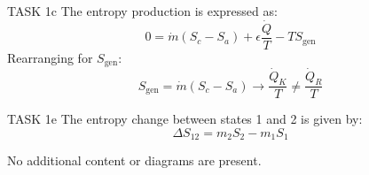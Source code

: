 TASK 1c  
The entropy production is expressed as:  
\[
0 = \dot{m}(S_c - S_a) + \epsilon \frac{\dot{Q}}{T} - T S_{\text{gen}}
\]  
Rearranging for \( S_{\text{gen}} \):  
\[
S_{\text{gen}} = \dot{m}(S_c - S_a) \to \frac{\dot{Q}_K}{T} \neq \frac{\dot{Q}_R}{T}
\]  

TASK 1e  
The entropy change between states 1 and 2 is given by:  
\[
\Delta S_{12} = m_2 S_2 - m_1 S_1
\]  

No additional content or diagrams are present.
